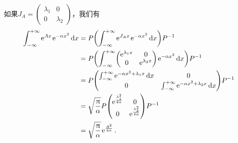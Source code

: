 \begin{solution}
  如果$J_A=\begin{pmatrix}
    \lambda_1 & 0 \\
    0 & \lambda_2
  \end{pmatrix}$，我们有
  \begin{align*}
    \int_{-\infty}^{+\infty} \ee^{Ax}\ee^{-\alpha x^2} \dif x & = P \left( \int_{-\infty}^{+\infty} \ee^{J_Ax}\ee^{-\alpha x^2} \dif x\right) P^{-1} \\
    & = P \left( \int_{-\infty}^{+\infty} \begin{pmatrix}
      \ee^{\lambda_1x} & 0 \\
      0 & \ee^{\lambda_2x}
    \end{pmatrix}\ee^{-\alpha x^2}\dif x \right) P^{-1} \\
    & = P \begin{pmatrix}
      \int_{-\infty}^{+\infty} \ee^{-\alpha x^2+\lambda_1x}\dif x & 0 \\
      0 & \int_{-\infty}^{+\infty} \ee^{-\alpha x^2+\lambda_2x}\dif x
    \end{pmatrix} P^{-1} \\
    & = \sqrt{\frac\pi\alpha} P \begin{pmatrix}
      \ee^{\frac{\lambda_1^2}{4\alpha}} & 0 \\
      0 & \ee^{\frac{\lambda_2^2}{4\alpha}}
    \end{pmatrix} P^{-1} \\
    & = \sqrt{\frac\pi\alpha} \ee^{\frac{A^2}{4\alpha}}.
  \end{align*}


\end{solution}
